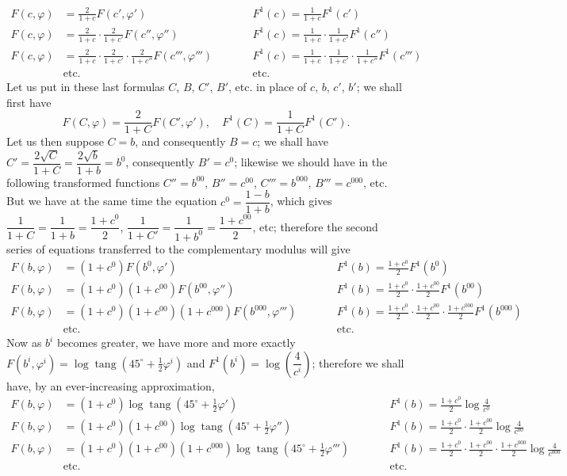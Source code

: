\documentclass{article}
\begin{document}
\[ \begin{aligned} F(c,\varphi)&=\frac{2}{1+c}F(c',\varphi') &\qquad& F^{1}(c)=\frac{1}{1+c}F^{1}(c')\\ F(c,\varphi)&=\frac{2}{1+c}\cdot\frac{2}{1+c'}F(c'',\varphi'') && F^{1}(c)=\frac{1}{1+c}\cdot\frac{1}{1+c'}F^{1}(c'')\\ F(c,\varphi)&=\frac{2}{1+c}\cdot\frac{2}{1+c'}\cdot\frac{2}{1+c''}F(c''',\varphi''') && F^{1}(c)=\frac{1}{1+c}\cdot\frac{1}{1+c'}\cdot\frac{1}{1+c''}F^{1}(c''')\\ &\text{etc.} && \text{etc.} \end{aligned} \]
Let us put in these last formulas $C$, $B$, $C'$, $B'$, etc. in place of $c$, $b$, $c'$, $b'$; we shall first have
\[ F(C,\varphi)=\frac{2}{1+C}F(C',\varphi'),\quad F^{1}(C)=\frac{1}{1+C}F^{1}(C'). \]
Let us then suppose $C=b$, and consequently $B=c$; we shall have $C'=\dfrac{2\sqrt{C}}{1+C}=\dfrac{2\sqrt{b}}{1+b}=b^{0}$, consequently $B'=c^{0}$; likewise we should have in the following transformed functions $C''=b^{00}$, $B''=c^{00}$, $C'''=b^{000}$, $B'''=c^{000}$, etc. But we have at the same time the equation $c^{0}=\dfrac{1-b}{1+b}$, which gives $\dfrac{1}{1+C}=\dfrac{1}{1+b}=\dfrac{1+c^{0}}{2}$, $\dfrac{1}{1+C'}=\dfrac{1}{1+b^{0}}=\dfrac{1+c^{00}}{2}$, etc; therefore the second series of equations transferred to the complementary modulus will give
\[ \begin{aligned} F(b,\varphi)&=(1+c^{0})F(b^{0},\varphi') &\qquad& F^{1}(b)=\frac{1+c^{0}}{2}F^{1}(b^{0})\\ F(b,\varphi)&=(1+c^{0})(1+c^{00})F(b^{00},\varphi'') && F^{1}(b)=\frac{1+c^{0}}{2}\cdot\frac{1+c^{00}}{2}F^{1}(b^{00})\\ F(b,\varphi)&=(1+c^{0})(1+c^{00})(1+c^{000})F(b^{000},\varphi''') && F^{1}(b)=\frac{1+c^{0}}{2}\cdot\frac{1+c^{00}}{2}\cdot\frac{1+c^{000}}{2}F^{1}(b^{000})\\ &\text{etc.} && \text{etc.} \end{aligned} \]
Now as $b^{i}$ becomes greater, we have more and more exactly $F(b^{i},\varphi^{i})=\log\operatorname{tang}(45^{\circ}+\frac{1}{2}\varphi^{i})$ and $F^{1}(b^{i})=\log\left(\dfrac{4}{c^{i}}\right)$; therefore we shall have, by an ever-increasing approximation,
\[ \begin{aligned} F(b,\varphi)&=(1+c^{0})\log\operatorname{tang}(45^{\circ}+\tfrac{1}{2}\varphi') &\qquad& F^{1}(b)=\frac{1+c^{0}}{2}\log\frac{4}{c^{0}}\\ F(b,\varphi)&=(1+c^{0})(1+c^{00})\log\operatorname{tang}(45^{\circ}+\tfrac{1}{2}\varphi'') && F^{1}(b)=\frac{1+c^{0}}{2}\cdot\frac{1+c^{00}}{2}\log\frac{4}{c^{00}}\\ F(b,\varphi)&=(1+c^{0})(1+c^{00})(1+c^{000})\log\operatorname{tang}(45^{\circ}+\tfrac{1}{2}\varphi''') && F^{1}(b)=\frac{1+c^{0}}{2}\cdot\frac{1+c^{00}}{2}\cdot\frac{1+c^{000}}{2}\log\frac{4}{c^{000}}\\ &\text{etc.} && \text{etc.} \end{aligned} \]
\end{document}
